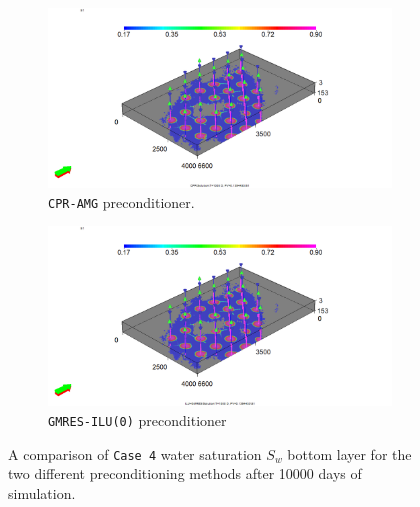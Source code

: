 \begin{figure}
\centering
\begin{subfigure}{.5\textwidth}
  \centering
  \includegraphics[width=1.3\linewidth]{figures/Case8_CPR_Sw_bl.png}
  \caption{\texttt{CPR-AMG} preconditioner.}
\end{subfigure}%
\begin{subfigure}{.5\textwidth}
  \centering
  \includegraphics[width=1.3\linewidth]{figures/Case8_ILU-GMRES_Sw_bl.png}
  \caption{\texttt{GMRES-ILU(0)} preconditioner}
\end{subfigure}
\caption{A comparison of \texttt{Case 4} water saturation $S_{w}$ bottom layer for the two different preconditioning methods after 10000 days of simulation.}
\label{case4swbl}
\end{figure}

